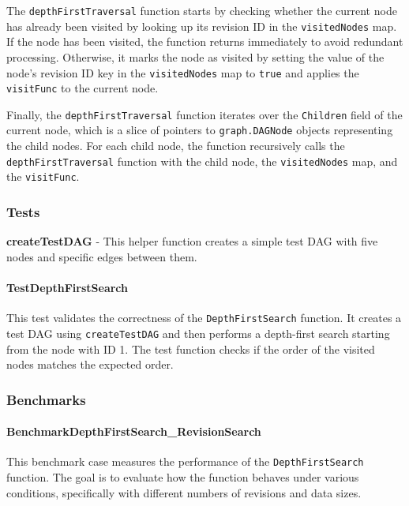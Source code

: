 The \lstinline{depthFirstTraversal} function starts by checking whether the current node has already been visited by looking up its revision ID in the \lstinline{visitedNodes} map. If the node has been visited, the function returns immediately to avoid redundant processing. Otherwise, it marks the node as visited by setting the value of the node's revision ID key in the \lstinline{visitedNodes} map to \lstinline{true} and applies the \lstinline{visitFunc} to the current node.
\smallskip

Finally, the \lstinline{depthFirstTraversal} function iterates over the \lstinline{Children} field of the current node, which is a slice of pointers to \lstinline{graph.DAGNode} objects representing the child nodes. For each child node, the function recursively calls the \lstinline{depthFirstTraversal} function with the child node, the \lstinline{visitedNodes} map, and the \lstinline{visitFunc}.

\subsubsection*{Tests}
\textbf{createTestDAG} - This helper function creates a simple test DAG with five nodes and specific edges between them.

\paragraph{TestDepthFirstSearch}
This test validates the correctness of the \lstinline{DepthFirstSearch} function. It creates a test DAG using \lstinline{createTestDAG} and then performs a depth-first search starting from the node with ID 1. The test function checks if the order of the visited nodes matches the expected order.

\subsubsection*{Benchmarks}

\paragraph{BenchmarkDepthFirstSearch\_RevisionSearch}
This benchmark case measures the performance of the \lstinline{DepthFirstSearch} function. The goal is to evaluate how the function behaves under various conditions, specifically with different numbers of revisions and data sizes.

